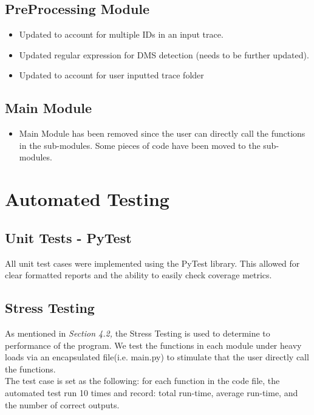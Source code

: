 \documentclass[12pt, titlepage]{article}
\begin{document}
\subsection{PreProcessing Module}
\begin{itemize}
    \item Updated to account for multiple IDs in an input trace.
    \item Updated regular expression for DMS detection (needs to be further updated).
    \item Updated to account for user inputted trace folder
\end{itemize}
\subsection{Main Module}
\begin{itemize}
    \item Main Module has been removed since the user can directly call the functions in the sub-modules. Some pieces of code have been moved to the sub-modules.
\end{itemize}

\section{Automated Testing}

\subsection{Unit Tests - PyTest}
All unit test cases were implemented using the PyTest library. This allowed for clear formatted reports and the ability to easily check coverage metrics. 

\subsection{Stress Testing}
As mentioned in \emph{Section 4.2,} the Stress Testing is used to determine to performance of the program. We test the functions in each module under heavy loads via an encapsulated file(i.e. main.py) to stimulate that the user directly call the functions.\\

\noindent The test case is set as the following: for each function in the code file, the automated test run 10 times and record: total run-time, average run-time, and the number of correct outputs.\\
\end{document}
